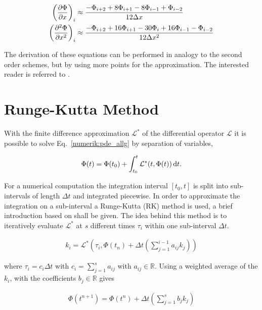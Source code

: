 \begin{align}
    \left(\pdn[\Phi]{x}\right)_i &\approx \frac{-\Phi_{i+2} + 8\Phi_{i+1} - 8\Phi_{i-1} + \Phi_{i-2}}{12\Delta x} \\
    \left(\pdn[^2\Phi]{x^2}\right)_i &\approx \frac{-\Phi_{i+2} + 16\Phi_{i+1} -30\Phi_i + 16\Phi_{i-1} - \Phi_{i-2}}{12\Delta x^2}
    \label{num:fd_o4_methods}
\end{align}

The derivation of these equations can be performed in analogy to the second order schemes, but by using more points for the
approximation. The interested reader is referred to \citep{Fornberg1988}.

\newpage

\section{Runge-Kutta Method}
\label{numerik:rk_williamson_sec}

With the finite difference approximation $\mathcal{L^*}$ of the differential operator $\mathcal{L}$
it is possible to solve Eq.~\ref{numerik:pde_allg} by separation of variables,

\begin{align}
    \Phi(t) = \Phi(t_0) + \int_{t_0}^{t} \mathcal{L^*} (t, \Phi(t)) \mathop{}\!\mathrm{d} t.
\end{align}

For a numerical computation the integration interval $[t_0, t]$  is split into sub-intervals  of length $\Delta t$ and integrated piecewise.
In order to approximate the integration on a sub-interval a Runge-Kutta  (RK) method is used, a brief introduction based  on \citep{umwelt} shall be given.
The idea behind this method is to iteratively evaluate $\mathcal{L^*}$ at $s$ different times $\tau_i$ within one sub-interval $\Delta t$.

\begin{align}
 k_i = \mathcal{L^*} \left(\tau_i, \Phi(t_n) + \Delta t \left( \sum_{j=1}^{i-1}a_{ij} k_j \right)\right)
\end{align}

where $\tau_i=c_i \Delta t$ with $c_i =\sum_{j=1}^{s}a_{ij}$ with $a_{ij} \in \mathbb{R}$.
Using a  weighted average of the $k_i$, with the coefficients $b_j\in\mathbb{R}$ gives

\begin{align}
    \Phi(t^{n+1}) = \Phi(t^n) + \Delta t \left( \sum_{j=1}^s b_j k_j \right)
\end{align}

